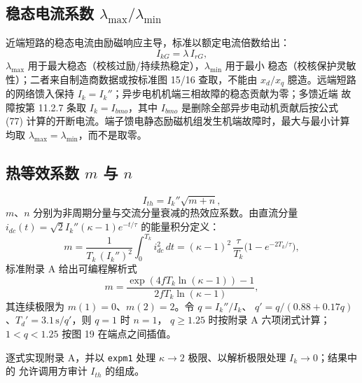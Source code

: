 \subsection{稳态电流系数 \texorpdfstring{$\lambda_{\max}/\lambda_{\min}$}{λmax/λmin}}
\begin{definition}[$\lambda$ 系数]
近端短路的稳态电流由励磁响应主导，标准以额定电流倍数给出：
\begin{equation}
I_{kG}=\lambda\,I_{rG},
\end{equation}
$\lambda_{\max}$ 用于最大稳态（校核过励/持续热稳定），$\lambda_{\min}$ 用于最小
稳态（校核保护灵敏性）；二者来自制造商数据或按标准图 15/16 查取，不能由 $x_d/x_q$
臆造。远端短路的网络馈入保持 $I_k=I_k''$；异步电机机端三相故障的稳态贡献为零；多馈近端
故障按第 11.2.7 条取 $I_k=I_{bmo}$，其中 $I_{bmo}$ 是删除全部异步电动机贡献后按公式 (77)
计算的开断电流。端子馈电静态励磁机组发生机端故障时，最大与最小计算均取
$\lambda_{\max}=\lambda_{\min}$，而不是取零。
\end{definition}

\subsection{热等效系数 \texorpdfstring{$m$}{m} 与 \texorpdfstring{$n$}{n}}
\begin{definition}[热等效短路电流]
\begin{equation}
I_{th}=I_k''\sqrt{m+n},
\end{equation}
$m$、$n$ 分别为非周期分量与交流分量衰减的热效应系数。由直流分量
$i_{dc}(t)=\sqrt2 I_k''(\kappa-1)e^{-t/\tau}$ 的能量积分定义：
\begin{equation}
m=\frac{1}{T_k\,(I_k'')^2}\int_0^{T_k} i_{dc}^2\,dt
=(\kappa-1)^2\,\frac{\tau}{T_k}\bigl(1-e^{-2T_k/\tau}\bigr),
\end{equation}
标准附录 A 给出可编程解析式
\begin{equation}
m=\frac{\exp\!\left(4fT_k\ln(\kappa-1)\right)-1}
        {2fT_k\ln(\kappa-1)},
\end{equation}
其连续极限为 $m(1)=0$、$m(2)=2$。令 $q=I_k''/I_k$、
$q'=q/(0.88+0.17q)$、$T_d'=3.1\,\mathrm{s}/q'$，则 $q=1$ 时 $n=1$，
$q\ge1.25$ 时按附录 A 六项闭式计算；$1<q<1.25$ 按图 19 在端点之间插值。
\end{definition}

\begin{theorynote}
 逐式实现附录 A，并以 \texttt{expm1} 处理
$\kappa\to2$ 极限、以解析极限处理 $I_k\to0$；结果中的 
允许调用方审计 $I_{th}$ 的组成。
\end{theorynote}

